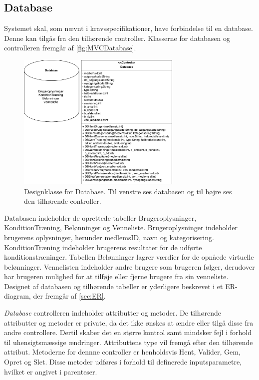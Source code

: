 \subsection*{Database} \label{sec:databaseDesign}
Systemet skal, som nævnt i kravsspecifikationer, have forbindelse til en database. Denne kan tilgås fra den tilhørende controller. Klasserne for databasen og controlleren fremgår af \autoref{fig:MVCDatabase}. 

\begin{figure} [H]
\centering
\includegraphics[width=0.7\textwidth]{figures/MVC/MVCDatabase}
\caption{Designklasse for Database. Til venstre ses databasen og til højre ses den tilhørende controller.}
\label{fig:MVCDatabase}
\end{figure}

\noindent
Databasen indeholder de oprettede tabeller Brugeroplysninger, KonditionTræning, Belønninger og Venneliste. Brugeroplysninger indeholder brugerens oplysninger, herunder medlemsID, navn og kategorisering. KonditionTræning indeholder brugerens resultater for de udførte konditionstræninger. Tabellen Belønninger lagrer værdier for de opnåede virtuelle belønninger. Vennelisten indeholder andre brugere som brugeren følger, derudover har brugeren mulighed for at tilføje eller fjerne brugere fra sin venneliste. Designet af databasen og tilhørende tabeller er yderligere beskrevet i et ER-diagram, der fremgår af \autoref{sec:ER}. 

\textit{Database} controlleren indeholder attributter og metoder. De tilhørende attributter og metoder er private, da det ikke ønskes at ændre eller tilgå disse fra andre controllere. Dertil skaber det en større kontrol samt mindsker fejl i forhold til uhensigtsmæssige ændringer. Attributtens type vil fremgå efter den tilhørende attribut. Metoderne for dennne controller er henholdsvis Hent, Valider, Gem, Opret og Slet. Disse metoder udføres i forhold til definerede inputsparametre, hvilket er angivet i parenteser.


